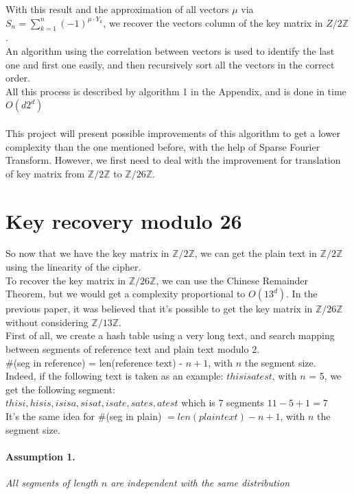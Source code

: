 \documentclass{article}
\begin{document}
With this result and the approximation of all vectors $\mu$ via $S_n = \sum_{k=1}^{n}{(-1)^{\mu \cdot Y_{k}}}$, we recover the vectors column of the key matrix in ${Z}/2\mathbb{Z}$.\\
An algorithm using the correlation between vectors is used to identify the last one and first one easily, and then recursively sort all the vectors in the correct order.\\
All this process is described by algorithm 1 in the Appendix, and is done in time $O(d 2^d)$\\
\\
This project will present possible improvements of this algorithm to get a lower complexity than the one mentioned before, with the help of Sparse Fourier Transform. However, we first need to deal with the improvement for translation of key matrix from $\mathbb{Z}/2\mathbb{Z}$ to $\mathbb{Z}/26\mathbb{Z}$.


\section{Key recovery modulo 26}
So now that we have the key matrix in $\mathbb{Z}/2\mathbb{Z}$, we can get the plain text in $\mathbb{Z}/2\mathbb{Z}$ using the linearity of the cipher.\\
To recover the key matrix in $\mathbb{Z}/26\mathbb{Z}$, we can use the Chinese Remainder Theorem, but we would get a complexity proportional to $O(13^d)$. In the previous paper, it was believed that it's possible to get the key matrix in $\mathbb{Z}/26\mathbb{Z}$ without considering $\mathbb{Z}/13\mathbb{Z}$.\\
First of all, we create a hash table using a very long text, and search mapping between segments of reference text and plain text modulo 2.\\
\#(seg in reference) = len(reference text) - $n +1$, with $n$ the segment size.\\
Indeed, if the following text is taken as an example: $thisisatest$, with $n$ = 5, we get the following segment:\\
 $ thisi, hisis, isisa, sisat, isate, sates, atest $ which is 7 segments $ 11 - 5 + 1 = 7 $\\
It's the same idea for \#(seg in plain) $= len(plain text) - n +1$, with $n$ the segment size.\\
\paragraph{Assumption 1.}\textit{All segments of length $n$ are independent with the same distribution}
\end{document}
